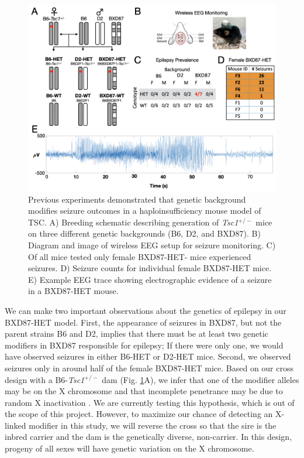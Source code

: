 \documentclass[
  12pt,
]{article}
\begin{document}
\begin{figure}[ht!]
\includegraphics[width=\textwidth]{Fig2.png} 
\caption{Previous experiments demonstrated that genetic background modifies seizure outcomes in a haploinsufficiency mouse model of TSC. A) Breeding schematic describing generation of \textit{Tsc1}$^{+/-}$ mice on three different genetic backgrounds (B6, D2, and BXD87). B) Diagram and image of wireless EEG setup for seizure monitoring. C) Of all mice tested only female BXD87-HET- mice experienced seizures. D) Seizure counts for individual female BXD87-HET mice. E) Example EEG trace showing electrographic evidence of a seizure in a BXD87-HET mouse.
}
\label{fig:bxd}
\end{figure}

We can make two important observations about the genetics of epilepsy in
our BXD87-HET model. First, the appearance of seizures in BXD87, but not
the parent strains B6 and D2, implies that there must be at least two
genetic modifiers in BXD87 responsible for epilepsy; If there were only
one, we would have observed seizures in either B6-HET or D2-HET mice.
Second, we observed seizures only in around half of the female BXD87-HET
mice. Based on our cross design with a B6-\textit{Tsc1}\(^{+/-}\) dam
(Fig. \ref{fig:bxd}A), we infer that one of the modifier alleles may be
on the X chromosome and that incomplete penetrance may be due to random
X inactivation \cite{15818384, 9618446}. We are currently testing this
hypothesis, which is out of the scope of this project. However, to
maximize our chance of detecting an X-linked modifier in this study, we
will reverse the cross so that the sire is the inbred carrier and the
dam is the genetically diverse, non-carrier. In this design, progeny of
all sexes will have genetic variation on the X chromosome.
\end{document}
